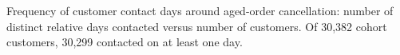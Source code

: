 Frequency of customer contact days around aged-order cancellation: number of distinct relative days contacted versus number of customers. Of 30,382 cohort customers, 30,299 contacted on at least one day.

